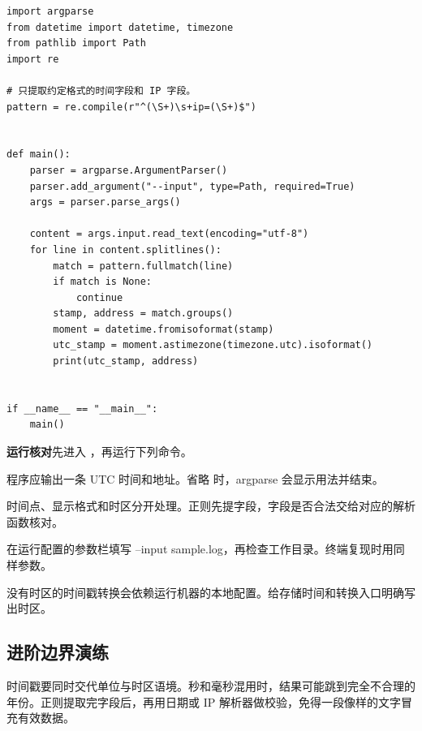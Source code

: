 \begin{lstlisting}[title={\code{scan_log.py}}]
import argparse
from datetime import datetime, timezone
from pathlib import Path
import re

# 只提取约定格式的时间字段和 IP 字段。
pattern = re.compile(r"^(\S+)\s+ip=(\S+)$")


def main():
    parser = argparse.ArgumentParser()
    parser.add_argument("--input", type=Path, required=True)
    args = parser.parse_args()

    content = args.input.read_text(encoding="utf-8")
    for line in content.splitlines():
        match = pattern.fullmatch(line)
        if match is None:
            continue
        stamp, address = match.groups()
        moment = datetime.fromisoformat(stamp)
        utc_stamp = moment.astimezone(timezone.utc).isoformat()
        print(utc_stamp, address)


if __name__ == "__main__":
    main()
\end{lstlisting}

\textbf{运行核对}\enspace 先进入 ，再运行下列命令。\par\noindent{}\par 程序应输出一条 UTC 时间和地址。省略  时，argparse 会显示用法并结束。

\begin{myunderstanding}
时间点、显示格式和时区分开处理。正则先提字段，字段是否合法交给对应的解析函数核对。
\end{myunderstanding}

\begin{pycharmpractice}
在运行配置的参数栏填写 --input sample.log，再检查工作目录。终端复现时用同样参数。
\end{pycharmpractice}

\begin{pitfall}
没有时区的时间戳转换会依赖运行机器的本地配置。给存储时间和转换入口明确写出时区。
\end{pitfall}

\subsection*{进阶边界演练}
时间戳要同时交代单位与时区语境。秒和毫秒混用时，结果可能跳到完全不合理的年份。正则提取完字段后，再用日期或 IP 解析器做校验，免得一段像样的文字冒充有效数据。
